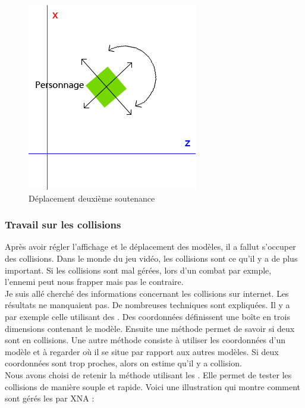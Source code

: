 \documentclass{article}
\begin{document}
\begin{figure}[h]
\begin{center}
\includegraphics[scale=0.5]{deplac2.jpg} 
\caption{Déplacement deuxième soutenance}
\end{center}
\end{figure}

\subsubsection{Travail sur les collisions}
Après avoir régler l'affichage et le déplacement des modèles, il a fallut s'occuper des collisions. Dans le monde du jeu vidéo, les collisions sont ce qu'il y a de plus important. Si les collisions sont mal gérées, lors d'un combat par exmple, l'ennemi peut nous frapper mais pas le contraire. \\
Je suis allé cherché des informations concernant les collisions sur internet. Les résultats ne manquaient pas. De nombreuses techniques sont expliquées. Il y a par exemple celle utilisant des . Des coordonnées définissent une boîte en trois dimensions contenant le modèle. Ensuite une méthode permet de savoir si deux  sont en collisions. Une autre méthode consiste à utiliser les coordonnées d'un modèle et à regarder où il se situe par rapport aux autres modèles. Si deux coordonnées sont trop proches, alors on estime qu'il y a collision.\\
Nous avons choisi de retenir la méthode utilisant les . Elle permet de tester les collisions de manière souple et rapide. Voici une illustration qui montre comment sont gérés les  par XNA : 
\end{document}
